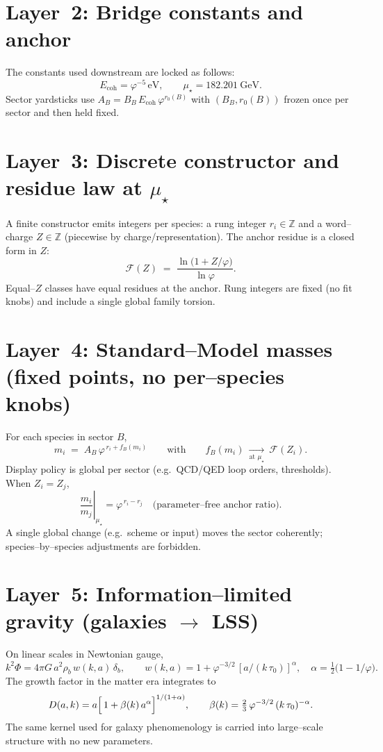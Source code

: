 \documentclass[11pt]{article}
\begin{document}
\section*{Layer~2: Bridge constants and anchor}
The constants used downstream are locked as follows:
\[
E_{\mathrm{coh}}=\varphi^{-5}\,\mathrm{eV},\qquad
\mu_\star=182.201~\mathrm{GeV}.
\]
Sector yardsticks use $A_B=B_B\,E_{\mathrm{coh}}\,\varphi^{r_0(B)}$ with $(B_B,r_0(B))$ frozen once per sector and then held fixed.

\section*{Layer~3: Discrete constructor and residue law at $\mu_\star$}
A finite constructor emits integers per species: a rung integer $r_i\in\mathbb Z$ and a word--charge $Z\in\mathbb Z$ (piecewise by charge/representation). The anchor residue is a closed form in $Z$:
\[
\mathcal F(Z)\;=\;\frac{\ln\!\bigl(1+Z/\varphi\bigr)}{\ln\varphi}.
\]
Equal--$Z$ classes have equal residues at the anchor. Rung integers are fixed (no fit knobs) and include a single global family torsion.

\section*{Layer~4: Standard--Model masses (fixed points, no per--species knobs)}
For each species in sector $B$,
\[
m_i\;=\;A_B\,\varphi^{\,r_i+f_B(m_i)}\qquad\text{with}\qquad f_B(m_i)\ \xrightarrow[\text{at }\mu_\star]{}\ \mathcal F(Z_i).
\]
Display policy is global per sector (e.g.\ QCD/QED loop orders, thresholds). When $Z_i=Z_j$,
\[
\left.\frac{m_i}{m_j}\right|_{\mu_\star}=\varphi^{\,r_i-r_j}\quad\text{(parameter--free anchor ratio)}.
\]
A single global change (e.g.\ scheme or input) moves the sector coherently; species--by--species adjustments are forbidden.

\section*{Layer~5: Information--limited gravity (galaxies $\rightarrow$ LSS)}
On linear scales in Newtonian gauge,
\[
k^{2}\Phi=4\pi G\,a^{2}\rho_{b}\,w(k,a)\,\delta_{b},\qquad
w(k,a)=1+\varphi^{-3/2}\,[a/(k\,\tau_{0})]^{\alpha},\quad
\alpha=\tfrac12\!\bigl(1-1/\varphi\bigr).
\]
The growth factor in the matter era integrates to
\[
D(a,k)=a\Bigl[\,1+\beta(k)\,a^{\alpha}\Bigr]^{1/(1+\alpha)},\qquad
\beta(k)=\tfrac{2}{3}\,\varphi^{-3/2}\,(k\,\tau_{0})^{-\alpha}.
\]
The same kernel used for galaxy phenomenology is carried into large--scale structure with no new parameters.
\end{document}
